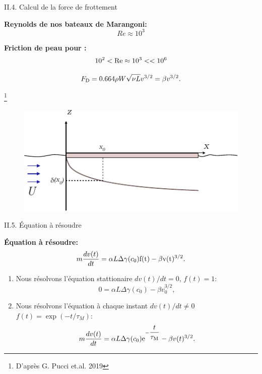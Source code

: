 \documentclass[aspectratio=169,10pt]{beamer}
\begin{document}
\begin{frame}{II.4. Calcul de la force de frottement}


    \begin{multicols}{2}
      \textbf{Reynolds de nos bateaux de Marangoni:}
      \[ Re \approx 10^3 \] 
    
      \textbf{Friction de peau pour :}
      $$10^{2}<\rm Re\approx 10^{3}<<10^{6}$$
    
      \begin{ombredef}
        \begin{defi}
      \begin{equation}
        F_{\rm D} = 0.664\rho W\sqrt{\nu L}v^{3/2}=\beta v^{3/2}.
        \end{equation}
        \end{defi}
    \end{ombredef}
    \footnote{D'après G. Pucci et.al. 2019}
    \begin{figure}
      \centering
      \includegraphics[scale=.8]{./figures/couchelimitesketch.pdf}
    \end{figure}
    \end{multicols}
    \end{frame}

    
\begin{frame}{II.5. Équation à résoudre}
    \begin{ombredef}
      \begin{defi}
        \noindent\textbf{Équation à résoudre:}
        \begin{equation}
          m\frac{dv(t)}{dt} =\alpha L\Delta\gamma(c_0)\rm f(t)-\beta v(t)^{3/2}.
        \end{equation}
      \end{defi}
    \end{ombredef}
    \begin{enumerate}
      \item Nous résolvons l'équation stattionaire $dv(t)/dt = 0$, $f(t)=1$:
       $$0 = \alpha L\Delta\gamma(c_0) - \beta v_0^{3/2},$$
      \item Nous résolvons l'équation à chaque instant $dv(t)/dt \neq 0$ $f(t)=\exp(-t/\tau_M)$:
      $$m\frac{dv(t)}{dt} =\alpha L\Delta\gamma(c_0) {\rm e}^{-\dfrac{t}{\tau_{\rm M}}}-\beta v(t)^{3/2}.$$
    \end{enumerate}
    \end{frame}
\end{document}
